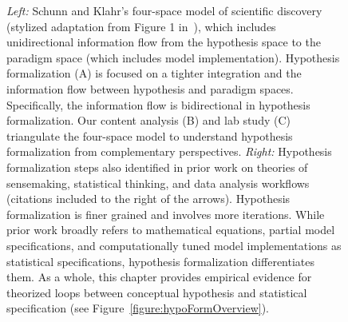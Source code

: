 {\begin{figure}[ht]
\begin{small}
\begin{minipage}{\linewidth}
         \textit{Left:}
        Schunn and
        Klahr's four-space model of scientific
        discovery (stylized adaptation from  Figure 1 in~\cite{schunn1995FourSpace}),
        which includes unidirectional information flow
        from the hypothesis space to the paradigm space (which includes
        model implementation). Hypothesis formalization (A) is focused on a
        tighter integration and the information flow between hypothesis and paradigm spaces.
        Specifically, the information flow is bidirectional in hypothesis formalization.
        Our content analysis (B) and lab study (C) triangulate the four-space
        model to understand hypothesis formalization
        from complementary perspectives.
        \textit{Right:} Hypothesis formalization steps also identified in
        prior work on theories of
        sensemaking, statistical thinking, and data analysis workflows (citations included to the right of the arrows).
        Hypothesis formalization is finer grained and involves more iterations.
        While prior work broadly refers to mathematical equations,
        partial model specifications, and computationally tuned model
        implementations as statistical specifications, hypothesis formalization
        differentiates them. As a whole, this chapter provides empirical evidence for
        theorized loops between conceptual hypothesis and statistical
        specification (see Figure~\ref{figure:hypoFormOverview}).
        \end{minipage}
        \end{small}
        \vspace*{-15pt}
      \end{figure}
}

